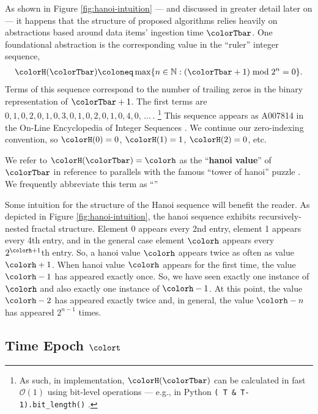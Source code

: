 As shown in Figure \ref{fig:hanoi-intuition} --- and discussed in greater detail later on --- it happens that the structure of proposed algorithms relies heavily on abstractions based around data items' ingestion time $\colorTbar$.
One foundational abstraction is the corresponding value in the ``ruler'' integer sequence,
\begin{align}
\colorH(\colorTbar)
\coloneq
\max \{ n \in \mathbb{N} : (\colorTbar + 1) \bmod 2^n = 0 \}.
\label{eqn:hanoi-defn}
\end{align}
Terms of this sequence correspond to the number of trailing zeros in the binary representation of $\colorTbar + 1$.
The first terms are $0,\allowbreak 1,\allowbreak 0,\allowbreak 2,\allowbreak 0,\allowbreak 1,\allowbreak 0,\allowbreak 3,\allowbreak 0,\allowbreak 1,\allowbreak 0,\allowbreak 2,\allowbreak 0,\allowbreak 1,\allowbreak 0,\allowbreak 4,\allowbreak 0,\allowbreak \,\ldots \,$.%
\footnote{%
As such, in implementation, $\colorH(\colorTbar)$ can be calculated in fast $\mathcal{O}(1)$ using bit-level operations --- e.g., in Python \texttt{(~T \& T-1).bit\_length()} \citep{oeis}.
}
This sequence appears as A007814 in the On-Line Encyclopedia of Integer Sequences \citep{oeis}.
We continue our zero-indexing convention, so $\colorH(0) = 0$, $\colorH(1) = 1$, $\colorH(2) = 0$, etc.

We refer to $\colorH(\colorTbar) = \colorh$ as the ``\textbf{hanoi value}'' of $\colorTbar$ in reference to parallels with the famous ``tower of hanoi'' puzzle \citep{lucas1889jeux}.
We frequently abbreviate this term as ``\textbf{\hv{}}''

Some intuition for the structure of the Hanoi sequence will benefit the reader.
As depicted in Figure \ref{fig:hanoi-intuition}, the hanoi sequence exhibits recursively-nested fractal structure.
Element 0 appears every 2nd entry, element 1 appears every 4th entry, and in the general case element $\colorh$ appears every $2^{\colorh+1}$th entry.
So, a hanoi value $\colorh$ appears twice as often as value $\colorh + 1$.
When hanoi value $\colorh$ appears for the first time, the value $\colorh - 1$ has appeared exactly once.
So, we have seen exactly one instance of $\colorh$ and also exactly one instance of $\colorh - 1$.
At this point, the value $\colorh - 2$ has appeared exactly twice and, in general, the value $\colorh - n$ has appeared $2^{n - 1}$ times.



\subsection{Time Epoch $\colort$}
\label{sec:notation-epoch}

